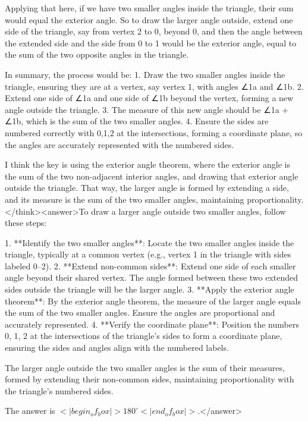 Applying that here, if we have two smaller angles inside the triangle, their sum would equal the exterior angle. So to draw the larger angle outside, extend one side of the triangle, say from vertex 2 to 0, beyond 0, and then the angle between the extended side and the side from 0 to 1 would be the exterior angle, equal to the sum of the two opposite angles in the triangle. 

In summary, the process would be: 1. Draw the two smaller angles inside the triangle, ensuring they are at a vertex, say vertex 1, with angles ∠1a and ∠1b. 2. Extend one side of ∠1a and one side of ∠1b beyond the vertex, forming a new angle outside the triangle. 3. The measure of this new angle should be ∠1a + ∠1b, which is the sum of the two smaller angles. 4. Ensure the sides are numbered correctly with 0,1,2 at the intersections, forming a coordinate plane, so the angles are accurately represented with the numbered sides. 

I think the key is using the exterior angle theorem, where the exterior angle is the sum of the two non-adjacent interior angles, and drawing that exterior angle outside the triangle. That way, the larger angle is formed by extending a side, and its measure is the sum of the two smaller angles, maintaining proportionality.</think><answer>To draw a larger angle outside two smaller angles, follow these steps:  

1. **Identify the two smaller angles**: Locate the two smaller angles inside the triangle, typically at a common vertex (e.g., vertex 1 in the triangle with sides labeled 0–2).  
2. **Extend non-common sides**: Extend one side of each smaller angle beyond their shared vertex. The angle formed between these two extended sides outside the triangle will be the larger angle.  
3. **Apply the exterior angle theorem**: By the exterior angle theorem, the measure of the larger angle equals the sum of the two smaller angles. Ensure the angles are proportional and accurately represented.  
4. **Verify the coordinate plane**: Position the numbers 0, 1, 2 at the intersections of the triangle’s sides to form a coordinate plane, ensuring the sides and angles align with the numbered labels.  

The larger angle outside the two smaller angles is the sum of their measures, formed by extending their non-common sides, maintaining proportionality with the triangle’s numbered sides.  

The answer is \(<|begin_of_box|>180^\circ<|end_of_box|>\).</answer>